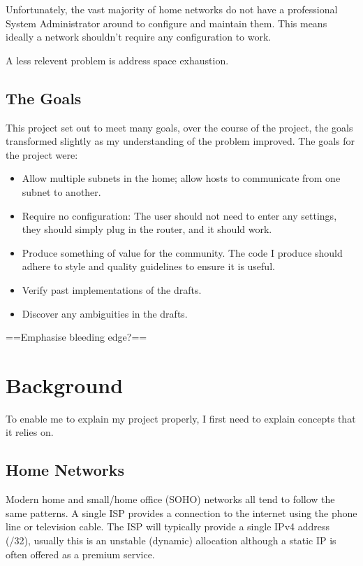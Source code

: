 \documentclass[12pt]{report}
\begin{document}
Unfortunately, the vast majority of home networks do not have a professional System
Administrator around to configure and maintain them. This means ideally a network
shouldn't require any configuration to work.

A less relevent problem is  address space exhaustion. 

\section{The Goals}
This project set out to meet many goals, over the course of the project, the
goals transformed slightly as my understanding of the problem improved. The
goals for the project were:
\begin{itemize}
\item Allow multiple subnets in the home; allow hosts to communicate from one
  subnet to another.
\item Require no configuration: The user should not need to enter any settings,
  they should simply plug in the router, and it should work.
\item Produce something of value for the community. The code I produce should
  adhere to style and quality guidelines to ensure it is useful.
\item Verify past implementations of the drafts.
\item Discover any ambiguities in the drafts.
\end{itemize}

==Emphasise bleeding edge?==

\chapter{Background}
To enable me to explain my project properly, I first need to explain concepts that 
it relies on.

\section{Home Networks}
Modern home and small/home office (SOHO) networks all tend to follow the same
patterns. A single ISP provides a connection to the internet using the phone
line or television cable.  The ISP will typically provide a single IPv4 address
(/32), usually this is an unstable (dynamic) allocation although a static IP is
often offered as a premium service. 
\end{document}
